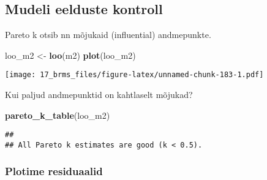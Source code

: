 \documentclass[]{article}
\newenvironment{Shaded}{\begin{snugshade}}{\end{snugshade}}
\newcommand{\KeywordTok}[1]{\textcolor[rgb]{0.13,0.29,0.53}{\textbf{#1}}}
\newcommand{\DataTypeTok}[1]{\textcolor[rgb]{0.13,0.29,0.53}{#1}}
\newcommand{\DecValTok}[1]{\textcolor[rgb]{0.00,0.00,0.81}{#1}}
\newcommand{\StringTok}[1]{\textcolor[rgb]{0.31,0.60,0.02}{#1}}
\newcommand{\OperatorTok}[1]{\textcolor[rgb]{0.81,0.36,0.00}{\textbf{#1}}}
\newcommand{\NormalTok}[1]{#1}
\begin{document}
\begin{Shaded}
\end{Shaded}

\subsection{Mudeli eelduste kontroll}\label{mudeli-eelduste-kontroll}

Pareto k otsib nn mõjukaid (influential) andmepunkte.

\begin{Shaded}
\begin{Highlighting}[]
\NormalTok{loo_m2 <-}\StringTok{ }\KeywordTok{loo}\NormalTok{(m2)}
\KeywordTok{plot}\NormalTok{(loo_m2)}
\end{Highlighting}
\end{Shaded}

\texttt{[image: 17\_brms\_files/figure-latex/unnamed-chunk-183-1.pdf]}

Kui paljud andmepunktid on kahtlaselt mõjukad?

\begin{Shaded}
\begin{Highlighting}[]
\KeywordTok{pareto_k_table}\NormalTok{(loo_m2) }
\end{Highlighting}
\end{Shaded}

\begin{verbatim}
## 
## All Pareto k estimates are good (k < 0.5).
\end{verbatim}

\subsubsection{Plotime residuaalid}\label{plotime-residuaalid}
\end{document}
